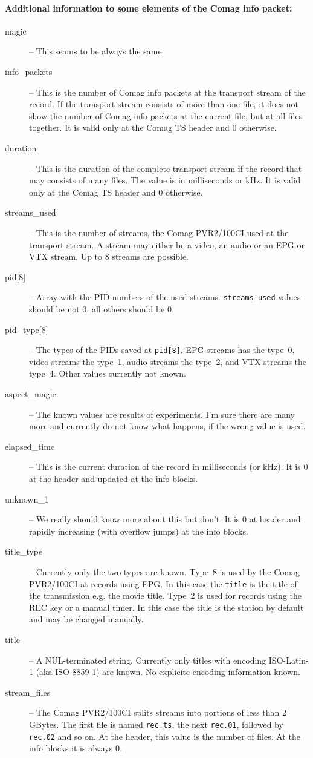 \documentclass{scrartcl}
\newcommand*{\Comag}{Comag PVR2/100CI\xspace}
\begin{document}
\paragraph{Additional information to some elements of the Comag info packet:}
\begin{description}
\item[magic] -- This seams to be always the same.
\item[info\_packets] -- This is the number of Comag info packets at the
  transport stream of the record. If the transport stream consists of more
  than one file, it does not show the number of Comag info packets at the
  current file, but at all files together. It is valid only at the Comag TS
  header and 0 otherwise.
\item[duration] -- This is the duration of the complete transport stream if
  the record that may consists of many files. The value is in milliseconds or
  kHz.  It is valid only at the Comag TS header and 0 otherwise.
\item[streams\_used] -- This is the number of streams, the \Comag used at the
  transport stream. A stream may either be a video, an audio or an EPG or VTX
  stream. Up to 8 streams are possible.
\item[{pid[8]}] -- Array with the PID numbers of the used
  streams. \texttt{streams\_used} values should be not 0, all others should be
  0.
\item[{pid\_type[8]}] -- The types of the PIDs saved at \texttt{pid[8]}. EPG
  streams has the type~0, video streams the type~1, audio streams the type~2,
  and VTX streams the type~4. Other values currently not known.
\item[aspect\_magic] -- The known values are results of experiments. I'm sure
  there are many more and currently do not know what happens, if the wrong
  value is used.
\item[elapsed\_time] -- This is the current duration of the record in
  milliseconds (or kHz). It is 0 at the header and updated at the info blocks.
\item[unknown\_1] -- We really should know more about this but don't. It is 0
  at header and rapidly increasing (with overflow jumps) at the info blocks.
\item[title\_type] -- Currently only the two types are known. Type~8 is used
  by the \Comag at records using EPG. In this case the \texttt{title} is the
  title of the transmission e.g. the movie title. Type~2 is used for records
  using the REC key or a manual timer. In this case the title is the station
  by default and may be changed manually.
\item[title] -- A NUL-terminated string.  Currently only titles with encoding
  ISO-Latin-1 (aka ISO-8859-1) are known.  No explicite encoding information
  known.
\item[stream\_files] -- The \Comag splits streams into portions of less than
  2\,GBytes. The first file is named \texttt{rec.ts}, the next
  \texttt{rec.01}, followed by \texttt{rec.02} and so on. At the header, this
  value is the number of files. At the info blocks it is always 0.
\end{description}
\end{document}
